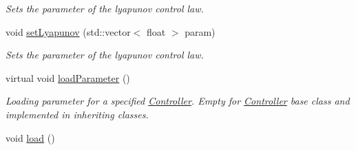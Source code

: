 \begin{DoxyCompactItemize}
\begin{DoxyCompactList}\small\item\em Sets the parameter of the lyapunov control law. \end{DoxyCompactList}\item 
void \hyperlink{classController_a1f77caed7a7951ca2f4cf7928f88669d}{set\+Lyapunov} (std\+::vector$<$ float $>$ param)
\begin{DoxyCompactList}\small\item\em Sets the parameter of the lyapunov control law. \end{DoxyCompactList}\item 
virtual void \hyperlink{classController_a59e60885d5307979faf477435507069a}{load\+Parameter} ()\hypertarget{classController_a59e60885d5307979faf477435507069a}{}\label{classController_a59e60885d5307979faf477435507069a}

\begin{DoxyCompactList}\small\item\em Loading parameter for a specified \hyperlink{classController}{Controller}. Empty for \hyperlink{classController}{Controller} base class and implemented in inheriting classes. \end{DoxyCompactList}\item 
void \hyperlink{classController_a55c77d2e41634c9b21543647f74eec4c}{load} ()\hypertarget{classController_a55c77d2e41634c9b21543647f74eec4c}{}\label{classController_a55c77d2e41634c9b21543647f74eec4c}


\end{DoxyCompactItemize}

